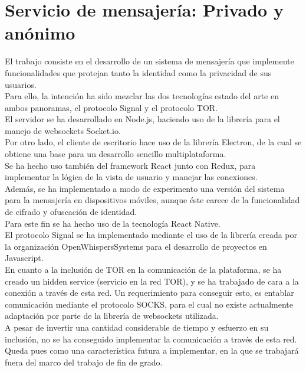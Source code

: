 \chapter{Servicio de mensajería: Privado y anónimo}

El trabajo consiste en el desarrollo de un sistema de mensajería que implemente funcionalidades que protejan tanto la identidad como la privacidad de sus usuarios. \\

Para ello, la intención ha sido mezclar las dos tecnologías estado del arte en ambos panoramas, el protocolo Signal y el protocolo TOR. \\

El servidor se ha desarrollado en Node.js, haciendo uso de la librería para el manejo de websockets Socket.io. \\

Por otro lado, el cliente de escritorio hace uso de la librería Electron, de la cual se obtiene una base para un desarrollo sencillo multiplataforma. \\
Se ha hecho uso también del framework React junto con Redux, para implementar la lógica de la vista de usuario y manejar las conexiones. \\

Además, se ha implementado a modo de experimento una versión del sistema para la mensajería en dispositivos móviles, aunque éste carece de la funcionalidad de cifrado y ofuscación de identidad. \\
Para este fin se ha hecho uso de la tecnología React Native. \\

El protocolo Signal se ha implementado mediante el uso de la librería creada por la organización OpenWhispersSystems para el desarrollo de proyectos en Javascript. \\


En cuanto a la inclusión de TOR en la comunicación de la plataforma, se ha creado un hidden service (servicio en la red TOR), y se ha trabajado de cara a la conexión a través de esta red. Un requerimiento para conseguir esto, es entablar comunicación mediante el protocolo SOCKS, para el cual no existe actualmente adaptación por parte de la librería de websockets utilizada. \\ 
A pesar de invertir una cantidad considerable de tiempo y esfuerzo en su inclusión, no se ha conseguido implementar la comunicación a través de esta red. Queda pues como una característica futura a implementar, en la que se trabajará fuera del marco del trabajo de fin de grado. \\ 

